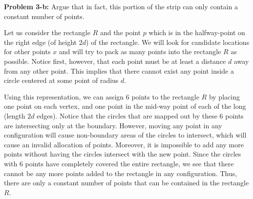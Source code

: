 \documentclass[psamsfonts]{amsart}
\newenvironment{sol}{\vspace{0.25cm}{\large \bfseries Solution:}}{\qedsymbol}
\newenvironment{prob}[1]{\begin{framed}{\large \bfseries Problem #1:}}{\end{framed}}
\begin{document}
\begin{prob}{3-b}
Argue that in fact, this portion of the strip can only contain a constant number of points.
\end{prob}
\begin{sol}
Let us consider the rectangle $R$ and the point $p$ which is in the halfway-point on the right edge (of height $2d$) of the rectangle. We will look for candidate locations for other points $x$ and will try to pack as many points into the rectangle $R$ as possible. Notice first, however, that each point must be at least a distance $d$ away from any other point. This implies that there cannot exist any point inside a circle centered at some point of radius $d$. 

Using this representation, we can assign 6 points to the rectangle $R$ by placing one point on each vertex, and one point in the mid-way point of each of the long (length $2d$ edges). Notice that the circles that are mapped out by these 6 points are intersecting only at the boundary. However, moving any point in any configuration will cause non-boundary areas of the circles to intersect, which will cause an invalid allocation of points. Moreover, it is impossible to add any more points without having the circles intersect with the new point. Since the circles with 6 points have completely covered the entire rectangle, we see that there cannot be any more points added to the rectangle in any configuration. Thus, there are only a constant number of points that can be contained in the rectangle $R$.
\end{sol}
\end{document}
